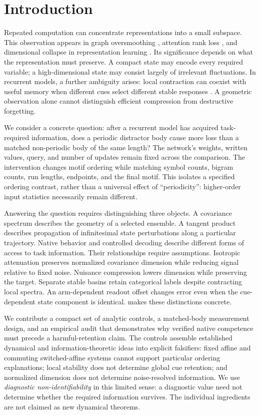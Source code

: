 \section{Introduction}
\label{sec:introduction}

Repeated computation can concentrate representations into a small subspace. This observation appears in graph oversmoothing \citep{oono2020exponential,roth2024rank}, attention rank loss \citep{pure_attention_rank}, and dimensional collapse in representation learning \citep{jing2022dimensional}. Its significance depends on what the representation must preserve. A compact state may encode every required variable; a high-dimensional state may consist largely of irrelevant fluctuations. In recurrent models, a further ambiguity arises: local contraction can coexist with useful memory when different cues select different stable responses \citep{pals2024-phase-locked-memory}. A geometric observation alone cannot distinguish efficient compression from destructive forgetting.

We consider a concrete question: after a recurrent model has acquired task-required information, does a periodic distractor body cause more loss than a matched non-periodic body of the same length? The network's weights, written values, query, and number of updates remain fixed across the comparison. The intervention changes motif ordering while matching symbol counts, bigram counts, run lengths, endpoints, and the final motif. This isolates a specified ordering contrast, rather than a universal effect of ``periodicity'': higher-order input statistics necessarily remain different.

Answering the question requires distinguishing three objects. A covariance spectrum describes the geometry of a selected ensemble. A tangent product describes propagation of infinitesimal state perturbations along a particular trajectory. Native behavior and controlled decoding describe different forms of access to task information. Their relationships require assumptions. Isotropic attenuation preserves normalized covariance dimension while reducing signal relative to fixed noise. Nuisance compression lowers dimension while preserving the target. Separate stable basins retain categorical labels despite contracting local spectra. An arm-dependent readout offset changes error even when the cue-dependent state component is identical.  makes these distinctions concrete.

We contribute a compact set of analytic controls, a matched-body measurement design, and an empirical audit that demonstrates why verified native competence must precede a harmful-retention claim. The controls assemble established dynamical and information-theoretic ideas into explicit falsifiers: fixed affine and commuting switched-affine systems cannot support particular ordering explanations; local stability does not determine global cue retention; and normalized dimension does not determine noise-resolved information. We use \emph{diagnostic non-identifiability} in this limited sense: a diagnostic value need not determine whether the required information survives. The individual ingredients are not claimed as new dynamical theorems.

